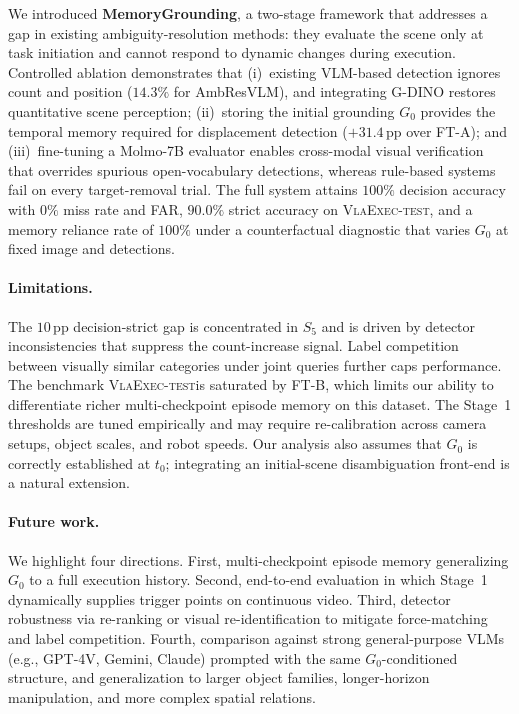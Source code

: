 \documentclass{article}
\newcommand{\datasettest}{\textsc{VlaExec-test}}
\begin{document}
We introduced \textbf{MemoryGrounding}, a two-stage framework that
addresses a gap in existing ambiguity-resolution methods: they evaluate
the scene only at task initiation and cannot respond to dynamic changes
during execution. Controlled ablation demonstrates that (i)~existing
VLM-based detection ignores count and position
($14.3\%$ for AmbResVLM), and integrating G-DINO restores quantitative
scene perception; (ii)~storing the initial grounding $G_0$ provides
the temporal memory required for displacement detection ($+31.4$\,pp
over FT-A); and (iii)~fine-tuning a Molmo-7B evaluator enables
cross-modal visual verification that overrides spurious open-vocabulary
detections, whereas rule-based systems fail on every target-removal
trial. The full system attains $100\%$ decision accuracy with $0\%$
miss rate and FAR, $90.0\%$ strict accuracy on
\datasettest, and a memory reliance rate of $100\%$ under
a counterfactual diagnostic that varies $G_0$ at fixed image and
detections.

\paragraph{Limitations.}
The $10$\,pp decision-strict gap is concentrated in $S_5$ and is driven
by detector inconsistencies that suppress the count-increase signal.
Label competition between visually similar categories under joint
queries further caps performance. The benchmark
\datasettest is saturated by FT-B, which limits our
ability to differentiate richer multi-checkpoint episode memory on this
dataset. The Stage~1 thresholds are tuned empirically and may require
re-calibration across camera setups, object scales, and robot speeds.
Our analysis also assumes that $G_0$ is correctly established at $t_0$;
integrating an initial-scene disambiguation front-end is a natural
extension.

\paragraph{Future work.}
We highlight four directions. First, multi-checkpoint episode memory
generalizing $G_0$ to a full execution history. Second, end-to-end
evaluation in which Stage~1 dynamically supplies trigger points on
continuous video. Third, detector robustness via re-ranking or visual
re-identification to mitigate force-matching and label competition.
Fourth, comparison against strong general-purpose VLMs (e.g., GPT-4V,
Gemini, Claude) prompted with the same $G_0$-conditioned structure, and
generalization to larger object families, longer-horizon manipulation,
and more complex spatial relations.
\end{document}
